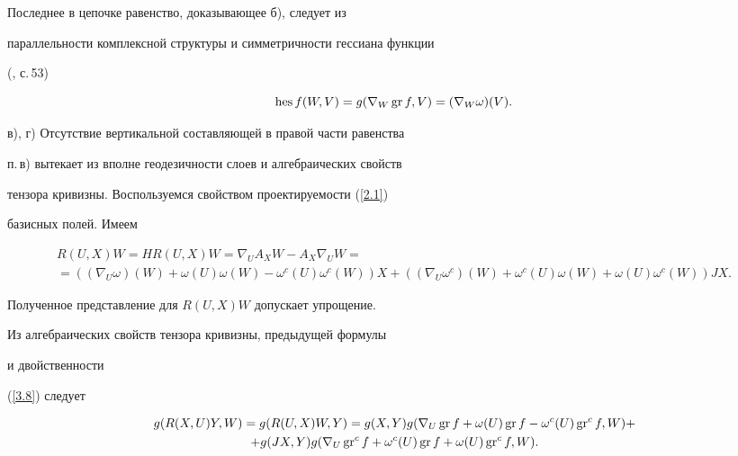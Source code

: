 Последнее в цепочке равенство, доказывающее б), следует из


параллельности комплексной структуры и симметричности гессиана функции


(\cite{B}, с.\,53)


\begin{equation}


\HES f(W,V)=g(\nabla_W\GR f,V)=(\nabla_W\omega )(V).


\label{3.16}


\end{equation}





в), г) Отсутствие вертикальной составляющей в правой части равенства


п.\,в) вытекает из вполне геодезичности слоев и алгебраических свойств


тензора кривизны. Воспользуемся свойством проектируемости (\ref{2.1})


базисных полей. Имеем


\begin{multline*}


R(U,X)W=HR(U,X)W=\nabla_UA_XW-A_X\nabla_UW=\\


%


=((\nabla_U\omega )(W)+\omega (U)\omega (W)-


\omega^c(U)\omega^c(W))X


+((\nabla_U\omega^c)(W)+\omega^c(U)\omega (W)+


\omega (U)\omega^c(W))JX.


\end{multline*}


Полученное представление для $R(U,X)W$ допускает упрощение.


Из алгебраических свойств тензора кривизны, предыдущей формулы


и двойственности


(\ref{3.8}) следует


\begin{multline}


g(R(X,U)Y,W)=g(R(U,X)W,Y)=


g(X,Y)g(\nabla_U\GR f+\omega (U)\GR f-\omega^c(U)\gr^c f,W)+\\


%


+g(JX,Y)g(\nabla_U\gr^c f+\omega^c(U)\GR f+\omega (U)\gr^c f,W).


\label{3.17}


\end{multline}



